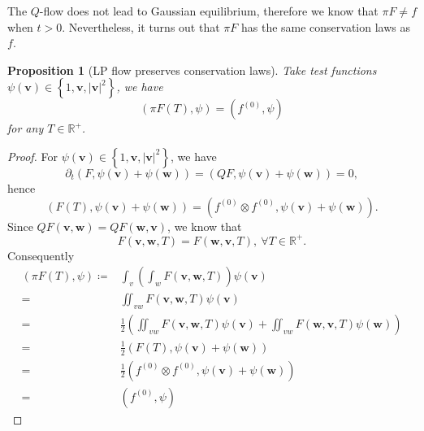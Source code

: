 \documentclass{article}
\newtheorem{prop}{Proposition}
\numberwithin{equation}{section}
\begin{document}
\bigskip
The $Q$-flow does not lead to Gaussian equilibrium, therefore we know that $\pi F \neq f$ when $t>0$. Nevertheless, it turns out that $\pi F$ has the same conservation laws as $f$.
\begin{prop}[LP flow preserves conservation laws]\label{prop:conservation}
    Take test functions $\psi(\mathbf{v}) \in \left\{1,\mathbf{v},|\mathbf{v}|^{2}\right\}$,  we have
    \begin{equation*}
        (\pi F( T), \psi) = (f^{(0)}, \psi)
    \end{equation*}
    for any $T \in \mathbb{R}^{+}$.
\end{prop}
\begin{proof}
    For $\psi(\mathbf{v}) \in \left\{1,\mathbf{v},|\mathbf{v}|^{2}\right\}$, we have
    \begin{equation*}
        \partial_{t}\left(F, \psi(\mathbf{v})+\psi(\mathbf{w})\right) = \left(QF, \psi(\mathbf{v})+\psi(\mathbf{w})\right) = 0,
    \end{equation*}
    hence
    \begin{equation*}
        \left(F(T), \psi(\mathbf{v})+\psi(\mathbf{w})\right) = \left(f^{(0)}\otimes f^{(0)} , \psi(\mathbf{v})+\psi(\mathbf{w})\right).
    \end{equation*}
    Since $QF(\mathbf{v},\mathbf{w}) = QF(\mathbf{w},\mathbf{v})$, we know that
    \begin{equation*}
        F(\mathbf{v},\mathbf{w}, T) = F(\mathbf{w},\mathbf{v}, T),\ \forall T\in \mathbb{R}^{+}.
    \end{equation*}
    Consequently
    \begin{equation*}
        \begin{split}
            \left(\pi F(T), \psi\right) \coloneqq& \int_{v}\left(\int_{w} F(\mathbf{v},\mathbf{w},T)\right)\psi(\mathbf{v}) \\
        = &\iint_{vw}F(\mathbf{v},\mathbf{w},T)\psi(\mathbf{v}) \\
        =& \frac{1}{2}\left(\iint_{vw}F(\mathbf{v},\mathbf{w},T)\psi(\mathbf{v}) + \iint_{vw}F(\mathbf{w},\mathbf{v},T)\psi(\mathbf{w})\right)\\
        =&\frac{1}{2}\left(F(T), \psi(\mathbf{v})+\psi(\mathbf{w})\right) \\
        =&\frac{1}{2}\left(f^{(0)}\otimes f^{(0)} , \psi(\mathbf{v})+\psi(\mathbf{w})\right)\\
        =&\left( f^{(0)}, \psi\right) 
        \end{split}
    \end{equation*}
\end{proof}
\end{document}
